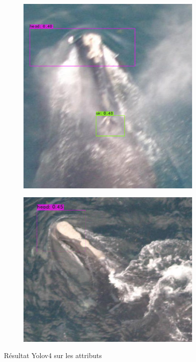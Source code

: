 \documentclass[12pt,a4paper]{report}
\begin{document}
\begin{spacing}{1.5}
\begin{figure}[H]
\begin{subfigure}{0.55\textwidth}
\includegraphics[width=\linewidth]{figures/sortie/yolov4/predictions3.jpg}
\end{subfigure}\hspace*{\fill}
\begin{subfigure}{0.58\textwidth}
\includegraphics[width=\linewidth]{figures/sortie/yolov4/predictions4.jpg}
\end{subfigure}
\caption{Résultat Yolov4 sur les attributs} \label{fig:1}
\end{figure}


\end{spacing}
\end{document}
